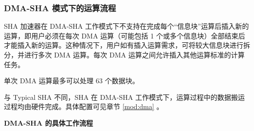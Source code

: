 \documentclass[main\_\_CN.tex]{subfiles}
\begin{document}
\subsubsection{DMA-SHA 模式下的运算流程}\label{sec:sha-dma-sha}

\chipname{} SHA 加速器在 DMA-SHA 工作模式下不支持在完成每个“信息块”运算后插入新的运算，即用户必须在每次 DMA 运算（可能包括 1 个或多个信息块）全部结束后才能插入新的运算。这种情况下，用户如有插入运算需求，可将较大信息块进行拆分，并进行多次 DMA 运算。每次 DMA 运算之间允许插入其他运算标准的计算任务。

单次 DMA 运算最多可以处理 63 个数据块。


与 Typical SHA 不同，SHA 在 DMA-SHA 工作模式下，运算过程中的数据搬运过程均由硬件完成。具体配置可见章节 \ref{mod:dma} \textit{}。

\textbf{DMA-SHA 的具体工作流程}
\end{document}

